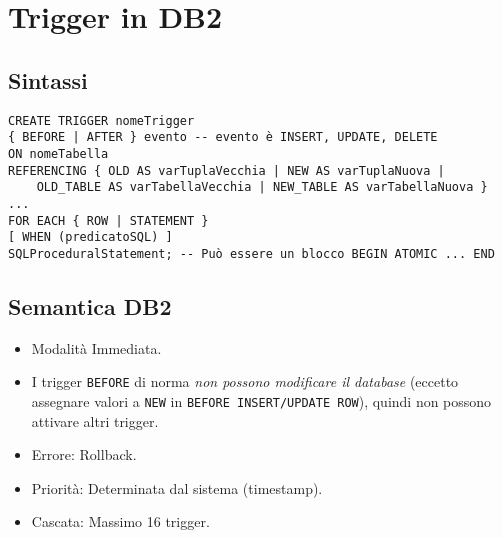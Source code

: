 \documentclass{article}
\begin{document}
	\section{Trigger in DB2}
	\subsection{Sintassi}
	\begin{verbatim}
CREATE TRIGGER nomeTrigger
{ BEFORE | AFTER } evento -- evento è INSERT, UPDATE, DELETE
ON nomeTabella
REFERENCING { OLD AS varTuplaVecchia | NEW AS varTuplaNuova |
	OLD_TABLE AS varTabellaVecchia | NEW_TABLE AS varTabellaNuova } ...
FOR EACH { ROW | STATEMENT }
[ WHEN (predicatoSQL) ]
SQLProceduralStatement; -- Può essere un blocco BEGIN ATOMIC ... END
	\end{verbatim}
	
	\subsection{Semantica DB2}
	\begin{itemize}
		\item Modalità Immediata.
		\item I trigger \texttt{BEFORE} di norma \textit{non possono modificare il database} (eccetto assegnare valori a \texttt{NEW} in \texttt{BEFORE INSERT/UPDATE ROW}), quindi non possono attivare altri trigger.
		\item Errore: Rollback.
		\item Priorità: Determinata dal sistema (timestamp).
		\item Cascata: Massimo 16 trigger.
	\end{itemize}
	
\end{document}
